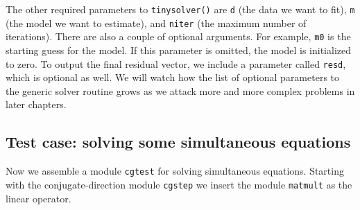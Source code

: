 \par
The other required parameters to \texttt{tinysolver()} 
are \texttt{d} (the data we want to fit),
\texttt{m} (the model we want to estimate),
and \texttt{niter} (the maximum number of iterations).
There are also a couple of optional arguments.
For example, \texttt{m0} is the starting guess for the model.
If this parameter is omitted, the model is initialized to zero.
To output the final residual vector,
we include a parameter called \texttt{resd},
which is optional as well.
We will watch how the list of optional parameters
to the generic solver routine grows
as we attack more and more complex problems in later chapters.

\begin{comment}
\subsection{Why C is much better than Fortran 77}
I'd like to digress from our geophysics-mathematics themes
to explain why C has been a great step forward
over Fortran 77.
All the illustrations in this book were originally computed in F77.
Then module
\texttt{tinysolver} \vpageref{lst:tinysolver}
was simply a subroutine.
It was not one module for the whole book, as it is now,
but it was many conceptually identical subroutines,
dozens of them, one subroutine for each application.
The reason for the proliferation was that F77 lacks the ability of C
to represent operators as having two ways to enter,
one for science and another for math.
On the other hand, F77 did not require the half a page
of definitions that we see here in C.
But the definitions are not difficult to understand,
and they are a clutter that we must see once and never again.
Another benefit is that the book in F77 had no easy way to switch
from the \texttt{cgstep} solver to other solvers.
\end{comment}

\subsection{Test case: solving some simultaneous equations}
\par
Now we assemble a module \texttt{cgtest} for solving simultaneous equations.
Starting with the conjugate-direction module {\tt cgstep} 
we insert the module \texttt{matmult}  as the linear operator.

